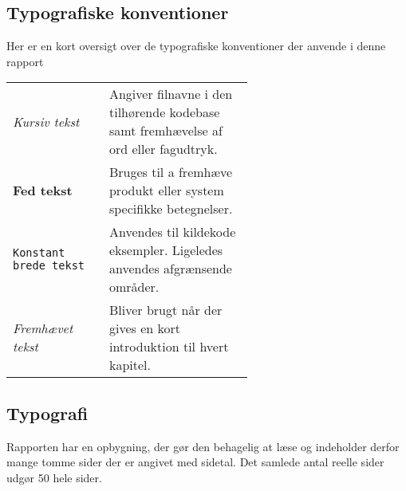 \subsection{Typografiske konventioner}
Her er en kort oversigt over de typografiske konventioner der anvende i denne rapport\\
\begin{tabular}{l p{0.6\linewidth}}
	\textit{Kursiv tekst}			& Angiver filnavne i den tilhørende kodebase samt fremhævelse af ord eller fagudtryk. \\
	\textbf{Fed tekst}				& Bruges til a fremhæve produkt eller system specifikke betegnelser.\\
	\texttt{Konstant brede tekst}	& Anvendes til kildekode eksempler. Ligeledes anvendes afgrænsende områder.\\
	\emph{Fremhævet tekst}		    & Bliver brugt når der gives en kort introduktion til hvert kapitel.\\
\end{tabular}

\subsection{Typografi}
Rapporten har en opbygning, der gør den behagelig at læse og indeholder derfor mange tomme sider der er angivet med sidetal.
Det samlede antal reelle sider udgør 50 hele sider. 


%

